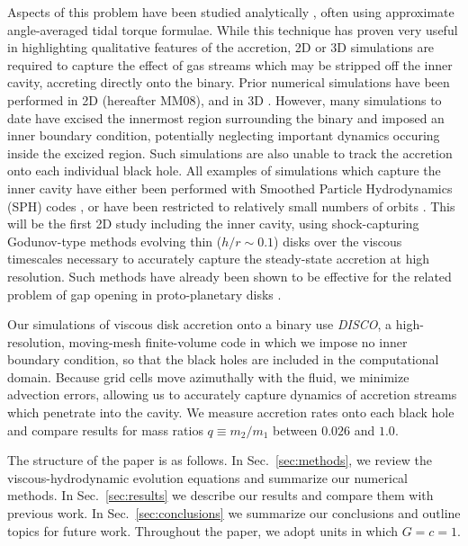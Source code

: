 \documentclass[apj]{emulateapj}
\begin{document}
Aspects of this problem have been studied analytically \citep{goldreich80,artymowicz94,ivanov99,armitage02,milos05,chang10,haiman09,shapiro10,liu10,kocsis12a,kocsis12b,tanaka13,shapiro13}, often using approximate angle-averaged tidal torque formulae. While this technique has proven very useful in highlighting qualitative features of the accretion, 2D or 3D simulations are required to capture the effect of gas streams which may be stripped off the inner cavity, accreting directly onto the binary. Prior numerical simulations have been performed in 2D \citep{macfadyen08} (hereafter MM08), \citep{cuadra09,dorazio13} and in 3D \citep{hayasaki07,farris11,farris12,noble12,shi12,roedig12,bode12,giacomazzo12}. However, many simulations to date have excised the innermost region surrounding the binary and imposed an inner boundary condition, potentially neglecting important dynamics occuring inside the excized region. Such simulations are also unable to track the accretion onto each individual black hole. All examples of simulations which capture the inner cavity have either been performed with Smoothed Particle Hydrodynamics (SPH) codes \citep{hayasaki07,cuadra09,nixon11,roedig12}, or have been restricted to relatively small numbers of orbits \citep{giacomazzo12,farris12}. This will be the first 2D study including the inner cavity, using shock-capturing Godunov-type methods evolving  thin ($h/r \sim 0.1$) disks over the viscous timescales necessary to accurately capture the steady-state accretion at high resolution. Such methods have already been shown to be effective for the related problem of gap opening in proto-planetary disks \citep{duffell13}.

Our simulations of viscous disk accretion onto a binary use {\it DISCO}, a high-resolution, moving-mesh finite-volume code \citep{duffell11,duffell12,duffell13} in which we impose no inner boundary condition, so that the black holes are included in the computational domain. Because grid cells move azimuthally with the fluid, we minimize advection errors, allowing us to accurately capture dynamics of accretion streams which penetrate into the cavity. We measure accretion rates onto each black hole and compare results for mass ratios $q \equiv m_2/m_1$ between $0.026$ and $1.0$.

The structure of the paper is as follows. In Sec.~\ref{sec:methods}, we review the viscous-hydrodynamic evolution equations and summarize our numerical methods. In Sec.~\ref{sec:results} we describe our results and compare them with previous work. In Sec.~\ref{sec:conclusions} we summarize our conclusions and outline topics for future work. Throughout the paper, we adopt units in which $G=c=1$.
\end{document}
